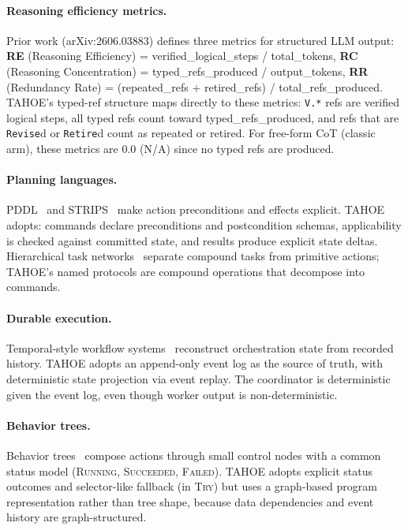 \documentclass[11pt,a4paper]{article}
\begin{document}
\paragraph{Reasoning efficiency metrics.}
Prior work (arXiv:2606.03883) defines three metrics for structured LLM output:
\textbf{RE} (Reasoning Efficiency) = verified\_logical\_steps / total\_tokens,
\textbf{RC} (Reasoning Concentration) = typed\_refs\_produced / output\_tokens,
\textbf{RR} (Redundancy Rate) = (repeated\_refs + retired\_refs) / total\_refs\_produced.
TAHOE's typed-ref structure maps directly to these metrics: \texttt{V.*} refs are verified logical steps, all typed refs count toward typed\_refs\_produced, and refs that are \texttt{Revise}d or \texttt{Retire}d count as repeated or retired.
For free-form CoT (classic arm), these metrics are 0.0 (N/A) since no typed refs are produced.

\paragraph{Planning languages.}
PDDL~\cite{fox2003pddl} and STRIPS~\cite{fikes1971strips} make action preconditions and effects explicit.
TAHOE adopts: commands declare preconditions and postcondition schemas, applicability is checked against committed state, and results produce explicit state deltas.
Hierarchical task networks~\cite{erol1994htn,nau2003shop2} separate compound tasks from primitive actions; TAHOE's named protocols are compound operations that decompose into commands.

\paragraph{Durable execution.}
Temporal-style workflow systems~\cite{temporal2024} reconstruct orchestration state from recorded history.
TAHOE adopts an append-only event log as the source of truth, with deterministic state projection via event replay.
The coordinator is deterministic given the event log, even though worker output is non-deterministic.

\paragraph{Behavior trees.}
Behavior trees~\cite{colledanchise2018bt} compose actions through small control nodes with a common status model (\textsc{Running}, \textsc{Succeeded}, \textsc{Failed}).
TAHOE adopts explicit status outcomes and selector-like fallback (in \textsc{Try}) but uses a graph-based program representation rather than tree shape, because data dependencies and event history are graph-structured.
\end{document}
